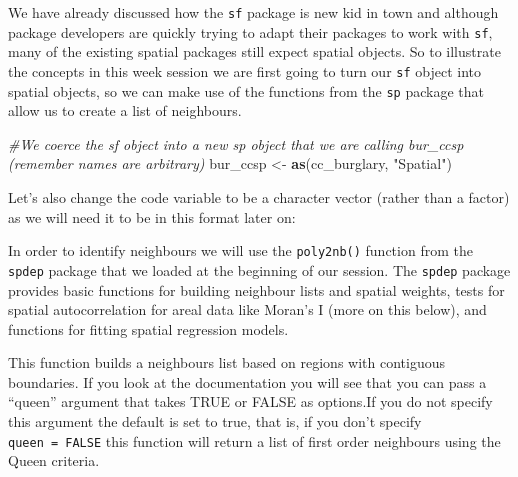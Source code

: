 \documentclass[]{book}
\newenvironment{Shaded}{\begin{snugshade}}{\end{snugshade}}
\newcommand{\CommentTok}[1]{\textcolor[rgb]{0.56,0.35,0.01}{\textit{#1}}}
\newcommand{\DataTypeTok}[1]{\textcolor[rgb]{0.13,0.29,0.53}{#1}}
\newcommand{\KeywordTok}[1]{\textcolor[rgb]{0.13,0.29,0.53}{\textbf{#1}}}
\newcommand{\NormalTok}[1]{#1}
\newcommand{\OperatorTok}[1]{\textcolor[rgb]{0.81,0.36,0.00}{\textbf{#1}}}
\newcommand{\StringTok}[1]{\textcolor[rgb]{0.31,0.60,0.02}{#1}}
\begin{document}
We have already discussed how the \texttt{sf} package is new kid in town and although package developers are quickly trying to adapt their packages to work with \texttt{sf}, many of the existing spatial packages still expect spatial objects. So to illustrate the concepts in this week session we are first going to turn our \texttt{sf} object into spatial objects, so we can make use of the functions from the \texttt{sp} package that allow us to create a list of neighbours.

\begin{Shaded}
\begin{Highlighting}[]
\CommentTok{#We coerce the sf object into a new sp object that we are calling bur_ccsp (remember names are arbitrary)}
\NormalTok{bur_ccsp <-}\StringTok{ }\KeywordTok{as}\NormalTok{(cc_burglary, }\StringTok{"Spatial"}\NormalTok{)}
\end{Highlighting}
\end{Shaded}

Let's also change the code variable to be a character vector (rather than a factor) as we will need it to be in this format later on:

\begin{Shaded}
\end{Shaded}

In order to identify neighbours we will use the \texttt{poly2nb()} function from the \texttt{spdep} package that we loaded at the beginning of our session. The \texttt{spdep} package provides basic functions for building neighbour lists and spatial weights, tests for spatial autocorrelation for areal data like Moran's I (more on this below), and functions for fitting spatial regression models.

This function builds a neighbours list based on regions with contiguous boundaries. If you look at the documentation you will see that you can pass a ``queen'' argument that takes TRUE or FALSE as options.If you do not specify this argument the default is set to true, that is, if you don't specify \texttt{queen\ =\ FALSE} this function will return a list of first order neighbours using the Queen criteria.

\begin{Shaded}
\end{Shaded}
\end{document}
